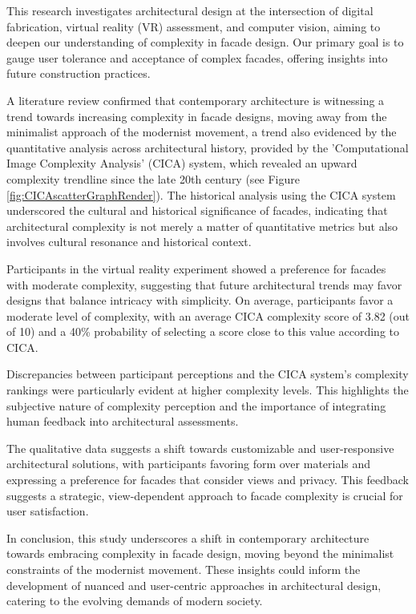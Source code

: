 


This research investigates architectural design at the intersection of digital fabrication, virtual reality (VR) assessment, and computer vision, aiming to deepen our understanding of complexity in facade design.
Our primary goal is to gauge user tolerance and acceptance of complex facades, offering insights into future construction practices.

A literature review confirmed that contemporary architecture is witnessing a trend towards increasing complexity in facade designs, moving away from the minimalist approach of the modernist movement, a trend also evidenced by the quantitative analysis across architectural history, provided by the 'Computational Image Complexity Analysis' (CICA) system, which revealed an upward complexity trendline since the late 20th century (see Figure \ref{fig:CICAscatterGraphRender}).
The historical analysis using the CICA system underscored the cultural and historical significance of facades, indicating that architectural complexity is not merely a matter of quantitative metrics but also involves cultural resonance and historical context.

Participants in the virtual reality experiment showed a preference for facades with moderate complexity, suggesting that future architectural trends may favor designs that balance intricacy with simplicity.
On average, participants favor a moderate level of complexity, with an average CICA complexity score of 3.82 (out of 10) and a 40\% probability of selecting a score close to this value according to CICA.

Discrepancies between participant perceptions and the CICA system's complexity rankings were particularly evident at higher complexity levels.
This highlights the subjective nature of complexity perception and the importance of integrating human feedback into architectural assessments.

The qualitative data suggests a shift towards customizable and user-responsive architectural solutions, with participants favoring form over materials and expressing a preference for facades that consider views and privacy.
This feedback suggests a strategic, view-dependent approach to facade complexity is crucial for user satisfaction.

In conclusion, this study underscores a shift in contemporary architecture towards embracing complexity in facade design, moving beyond the minimalist constraints of the modernist movement.
These insights could inform the development of nuanced and user-centric approaches in architectural design, catering to the evolving demands of modern society.
